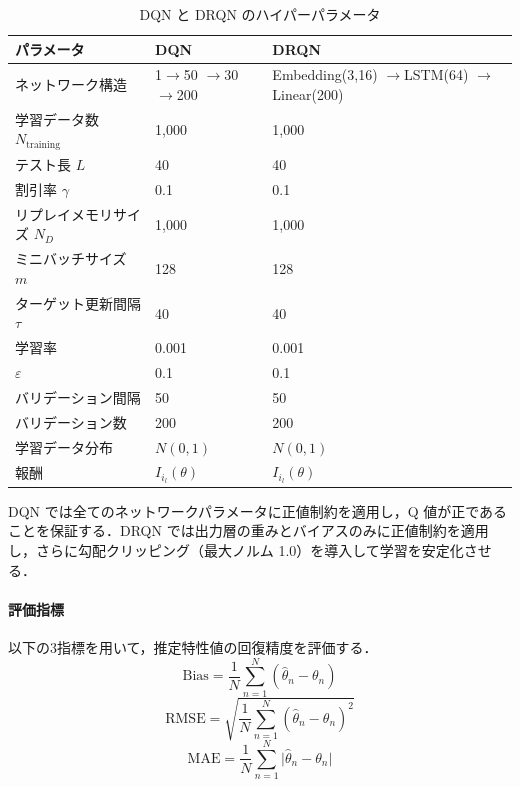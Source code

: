 \documentclass[dvipdfmx,a4j]{jarticle}
\begin{document}
\begin{table}[t]
\centering
\caption{DQN と DRQN のハイパーパラメータ}
\label{tab:hyperparams}
\scriptsize
\setlength{\tabcolsep}{3pt}
\begin{tabular}{p{}p{}p{}}
\toprule
パラメータ & DQN & DRQN \\
\midrule
ネットワーク構造 & \shortstack[l]{1$\to$50\\$\to$30$\to$200} & \shortstack[l]{Embedding(3,16)\\$\to$LSTM(64)\\$\to$Linear(200)} \\
学習データ数 $N_{\mathrm{training}}$ & 1,000 & 1,000 \\
テスト長 $L$ & 40 & 40 \\
割引率 $\gamma$ & 0.1 & 0.1 \\
リプレイメモリサイズ $N_D$ & 1,000 & 1,000 \\
ミニバッチサイズ $m$ & 128 & 128 \\
ターゲット更新間隔 $\tau$ & 40 & 40 \\
学習率 & 0.001 & 0.001 \\
$\varepsilon$ & 0.1 & 0.1 \\
バリデーション間隔 & 50 & 50 \\
バリデーション数 & 200 & 200 \\
学習データ分布 & $N(0,1)$ & $N(0,1)$ \\
報酬 & $I_{i_l}(\theta)$ & $I_{i_l}(\theta)$ \\
\bottomrule
\end{tabular}
\end{table}

DQN では全てのネットワークパラメータに正値制約を適用し，Q 値が正であることを保証する．DRQN では出力層の重みとバイアスのみに正値制約を適用し，さらに勾配クリッピング（最大ノルム 1.0）を導入して学習を安定化させる．

\paragraph{評価指標}
以下の3指標を用いて，推定特性値の回復精度を評価する．
\begin{equation}
\mathrm{Bias} = \frac{1}{N} \sum_{n=1}^{N} (\hat{\theta}_n - \theta_n)
\end{equation}
\begin{equation}
\mathrm{RMSE} = \sqrt{\frac{1}{N} \sum_{n=1}^{N} (\hat{\theta}_n - \theta_n)^2}
\end{equation}
\begin{equation}
\mathrm{MAE} = \frac{1}{N} \sum_{n=1}^{N} \lvert \hat{\theta}_n - \theta_n \rvert
\end{equation}
\end{document}
